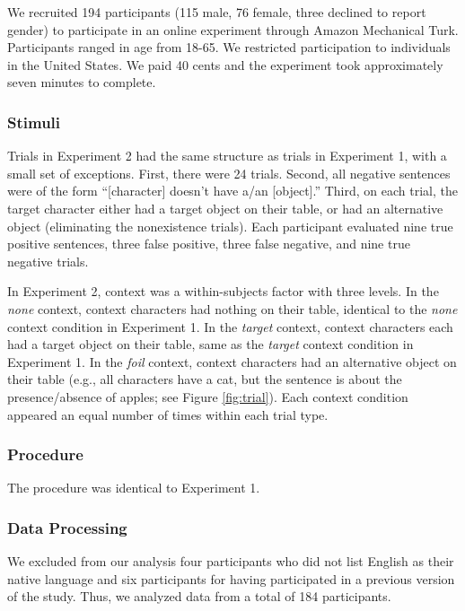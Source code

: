 \documentclass[10pt,letterpaper]{article}
\begin{document}
We recruited 194 participants (115 male, 76 female, three declined to report gender) to participate in an online experiment through Amazon Mechanical Turk.  Participants ranged in age from 18-65.  We restricted participation to individuals in the United States. We paid 40 cents and the experiment took approximately seven minutes to complete.  

\subsubsection{Stimuli}

Trials in Experiment 2 had the same structure as trials in Experiment 1, with a small set of exceptions. First, there were 24 trials. Second, all negative sentences were of the form ``[character] doesn't have a/an [object].'' Third, on each trial, the target character either had a target object on their table, or had an alternative object (eliminating the nonexistence trials).  Each participant evaluated nine true positive sentences, three false positive, three false negative, and nine true negative trials.

In Experiment 2, context was a within-subjects factor with three levels. In the \emph{none} context, context characters had nothing on their table, identical to the \emph{none} context condition in Experiment 1. In the \emph{target} context, context characters each had a target object on their table, same as the \emph{target} context condition in Experiment 1. In the \emph{foil} context, context characters had an alternative object on their table (e.g., all characters have a cat, but the sentence is about the presence/absence of apples; see Figure \ref{fig:trial}).  Each context condition appeared an equal number of times within each trial type.  

\subsubsection{Procedure}

The procedure was identical to Experiment 1.

\subsubsection{Data Processing}

We excluded from our analysis four participants who did not list English as their native language and six participants for having participated in a previous version of the study.  Thus, we analyzed data from a total of 184 participants.  
\end{document}
